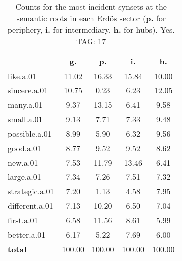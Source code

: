 \begin{table}[h!]
\begin{center}
\begin{tabular}{| l | c | c | c | c |}\hline
 & g. & p. & i. & h. \\\hline
like.a.01 & 11.02  & 16.33  & 15.84  & 10.00 \\\hline
sincere.a.01 & 10.75  & 0.23  & 6.23  & 12.05 \\\hline
many.a.01 & 9.37  & 13.15  & 6.41  & 9.58 \\\hline
small.a.01 & 9.13  & 7.71  & 7.33  & 9.48 \\\hline
possible.a.01 & 8.99  & 5.90  & 6.32  & 9.56 \\\hline
good.a.01 & 8.77  & 9.52  & 9.52  & 8.62 \\\hline
new.a.01 & 7.53  & 11.79  & 13.46  & 6.41 \\\hline
large.a.01 & 7.34  & 7.26  & 7.51  & 7.32 \\\hline
strategic.a.01 & 7.20  & 1.13  & 4.58  & 7.95 \\\hline
different.a.01 & 7.13  & 10.20  & 6.50  & 7.04 \\\hline
first.a.01 & 6.58  & 11.56  & 8.61  & 5.99 \\\hline
better.a.01 & 6.17  & 5.22  & 7.69  & 6.00 \\\hline
{{\bf total}} & 100.00  & 100.00  & 100.00  & 100.00 \\\hline
\end{tabular}
\caption{Counts for the most incident synsets at the semantic roots in each Erd\"os sector ({\bf p.} for periphery, {\bf i.} for intermediary, {\bf h.} for hubs). Yes. TAG: 17}
\end{center}
\end{table}